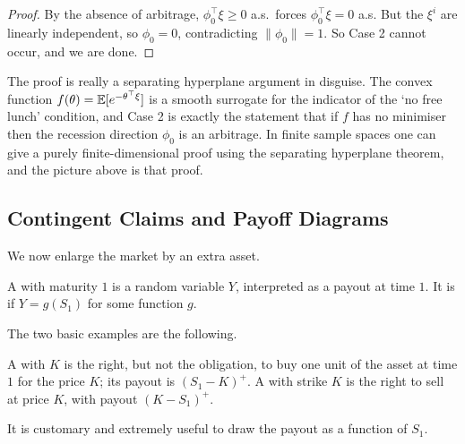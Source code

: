 \documentclass[a4paper]{scrartcl}
\begin{document}
\begin{proof}
	By the absence of arbitrage, $\phi_0^\top\xi \geq 0$ a.s.\ forces $\phi_0^\top \xi = 0$ a.s. But the $\xi^i$ are linearly independent, so $\phi_0 = 0$, contradicting $\|\phi_0\| = 1$. So Case 2 cannot occur, and we are done.
\end{proof}

\begin{remark}
	The proof is really a separating hyperplane argument in disguise. The convex function $f(\theta) = \mathbb{E}[e^{-\theta^\top\xi}]$ is a smooth surrogate for the indicator of the `no free lunch' condition, and Case 2 is exactly the statement that if $f$ has no minimiser then the recession direction $\phi_0$ is an arbitrage. In finite sample spaces one can give a purely finite-dimensional proof using the separating hyperplane theorem, and the picture above is that proof.
\end{remark}

\subsection{Contingent Claims and Payoff Diagrams}

We now enlarge the market by an extra asset.

\begin{definition}
	A  with maturity $1$ is a random variable $Y$, interpreted as a payout at time $1$. It is  if $Y = g(S_1)$ for some function $g$.
\end{definition}

The two basic examples are the following.

\begin{definition}
	A  with  $K$ is the right, but not the obligation, to buy one unit of the asset at time $1$ for the price $K$; its payout is $(S_1-K)^+$. A  with strike $K$ is the right to sell at price $K$, with payout $(K - S_1)^+$.
\end{definition}

It is customary and extremely useful to draw the payout as a function of $S_1$.
\end{document}
